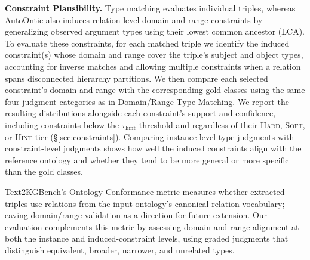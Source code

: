 \documentclass[11pt]{article}
\begin{document}
\textbf{Constraint Plausibility.} Type matching evaluates individual triples, whereas AutoOntic also induces relation-level domain and range constraints by generalizing observed argument types using their lowest common ancestor (LCA). To evaluate these constraints, for each matched triple we identify the induced constraint(s) whose domain and range cover the triple's subject and object types, accounting for inverse matches and allowing multiple constraints when a relation spans disconnected hierarchy partitions. We then compare each selected constraint's domain and range with the corresponding gold classes using the same four judgment categories as in Domain/Range Type Matching. We report the resulting distributions alongside each constraint's support and confidence, including constraints below the $\tau_{\text{hint}}$ threshold and regardless of their \textsc{Hard}, \textsc{Soft}, or \textsc{Hint} tier (\S\ref{sec:constraints}). Comparing instance-level type judgments with constraint-level judgments shows how well the induced constraints align with the reference ontology and whether they tend to be more general or more specific than the gold classes.

Text2KGBench's Ontology Conformance metric measures whether extracted triples use relations from the input ontology's canonical relation vocabulary; eaving domain/range validation as a direction for future extension\citep{mihindukulasooriya2023text2kgbench}. Our evaluation complements this metric by assessing domain and range alignment at both the instance and induced-constraint levels, using graded judgments that distinguish equivalent, broader, narrower, and unrelated types.


\end{document}
